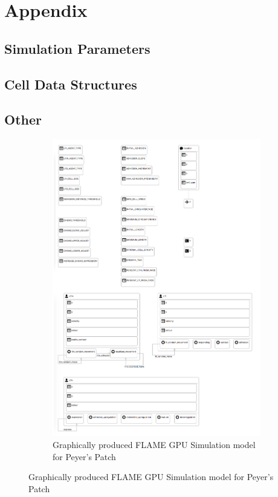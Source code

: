 \documentclass{UoYCSproject}
\begin{document}

\printbibliography
\chapter{Appendix}
\section{Simulation Parameters}


\section{Cell Data Structures}

\section{Other}

\begin{figure}[htp]
\centering
\begin{subfigure}{\textwidth}
\centering
\includegraphics[width=\textwidth]{Appendix/ppsim_gmf}
\caption{Graphically produced \gls{FLAME GPU} Simulation model for Peyer's Patch}
\label{fig:ppsim_gmf}
\end{subfigure}%
\end{figure}
\end{document}
